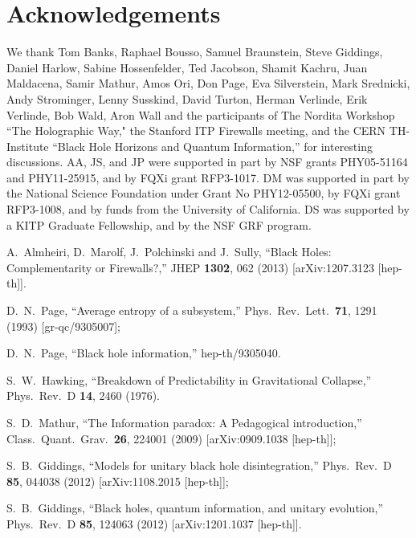\documentclass[12pt]{article}
\begin{document}
{\section*{Acknowledgements}
We thank Tom Banks, Raphael Bousso, Samuel Braunstein, Steve Giddings, Daniel Harlow, Sabine Hossenfelder, Ted Jacobson, Shamit Kachru, Juan Maldacena, Samir Mathur, Amos Ori, Don Page, Eva Silverstein, Mark Srednicki, Andy Strominger, Lenny Susskind, David Turton, Herman Verlinde, Erik Verlinde, Bob Wald, Aron Wall and the participants of The Nordita Workshop ``The Holographic Way," the Stanford ITP Firewalls meeting, and the CERN TH-Institute ``Black Hole Horizons and Quantum Information,'' for interesting discussions.
AA, JS, and JP were supported in part by NSF grants PHY05-51164 and PHY11-25915, and by FQXi grant RFP3-1017.  DM was supported in part by the National Science Foundation under Grant No PHY12-05500,  by FQXi grant RFP3-1008, and by funds from the University of California.  DS was supported by a KITP Graduate Fellowship, and by the NSF GRF program.

\begin{thebibliography}{99}
  A.~Almheiri, D.~Marolf, J.~Polchinski and J.~Sully,
  ``Black Holes: Complementarity or Firewalls?,''
  JHEP {\bf 1302}, 062 (2013)
  [arXiv:1207.3123 [hep-th]].

  D.~N.~Page,
  ``Average entropy of a subsystem,''
  Phys.\ Rev.\ Lett.\  {\bf 71}, 1291 (1993)
  [gr-qc/9305007];

  D.~N.~Page,
  ``Black hole information,''
  hep-th/9305040.

  S.~W.~Hawking,
  ``Breakdown of Predictability in Gravitational Collapse,''
  Phys.\ Rev.\ D {\bf 14}, 2460 (1976).

  S.~D.~Mathur,
  ``The Information paradox: A Pedagogical introduction,''
  Class.\ Quant.\ Grav.\  {\bf 26}, 224001 (2009)
  [arXiv:0909.1038 [hep-th]];

  S.~B.~Giddings,
  ``Models for unitary black hole disintegration,''
  Phys.\ Rev.\ D {\bf 85}, 044038 (2012)
  [arXiv:1108.2015 [hep-th]];


  S.~B.~Giddings,
  ``Black holes, quantum information, and unitary evolution,''
  Phys.\ Rev.\ D {\bf 85}, 124063 (2012)
  [arXiv:1201.1037 [hep-th]].


\end{thebibliography}}
\end{document}
